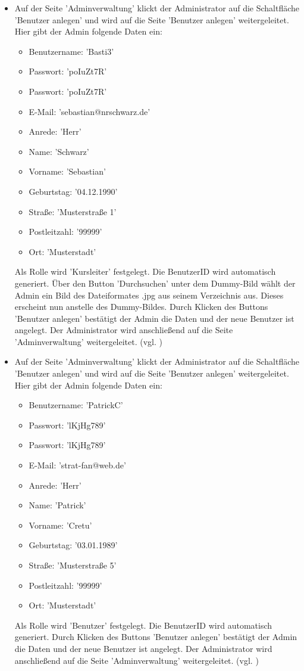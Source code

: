 \documentclass[a4paper]{scrreprt}
\begin{document}
\begin{itemize}
				\item {} 
				 Auf der Seite 'Adminverwaltung' klickt der Administrator auf die Schaltfläche 'Benutzer anlegen' und wird auf die Seite 'Benutzer anlegen' weitergeleitet. Hier gibt der Admin folgende Daten ein:
					\begin{itemize}
						\item Benutzername: 'Basti3' 
						\item Passwort: 'poIuZt7R'
						\item Passwort: 'poIuZt7R'
						\item E-Mail: 'sebastian@nrschwarz.de'
						\item Anrede: 'Herr'
						\item Name: 'Schwarz'
						\item Vorname: 'Sebastian'
						\item Geburtstag: '04.12.1990'
						\item Straße: 'Musterstraße 1'
						\item Postleitzahl: '99999'
						\item Ort: 'Musterstadt'
					\end{itemize}
				 Als Rolle wird 'Kursleiter' festgelegt. Die BenutzerID wird automatisch generiert. Über den Button 'Durchsuchen' unter dem Dummy-Bild wählt der Admin ein Bild des Dateiformates .jpg aus seinem Verzeichnis aus. Dieses erscheint nun anstelle des Dummy-Bildes. Durch Klicken des Buttons 'Benutzer anlegen' bestätigt der Admin die Daten und der neue Benutzer ist angelegt. Der Administrator wird anschließend auf die Seite 'Adminverwaltung' weitergeleitet. (vgl. )
				
				\item {} 
				Auf der Seite 'Adminverwaltung' klickt der Administrator auf die Schaltfläche 'Benutzer anlegen' und wird auf die Seite 'Benutzer anlegen' weitergeleitet. Hier gibt der Admin folgende Daten ein:
				\begin{itemize}
					\item Benutzername: 'PatrickC' 
					\item Passwort: 'lKjHg789'
					\item Passwort: 'lKjHg789'
					\item E-Mail: 'strat-fan@web.de'
					\item Anrede: 'Herr'
					\item Name: 'Patrick'
					\item Vorname: 'Cretu'
					\item Geburtstag: '03.01.1989'
					\item Straße: 'Musterstraße 5'
					\item Postleitzahl: '99999'
					\item Ort: 'Musterstadt'
				\end{itemize}
				Als Rolle wird 'Benutzer' festgelegt. Die BenutzerID wird automatisch generiert. Durch Klicken des Buttons 'Benutzer anlegen' bestätigt der Admin die Daten und der neue Benutzer ist angelegt. Der Administrator wird anschließend auf die Seite 'Adminverwaltung' weitergeleitet. (vgl. )
				

\end{itemize}
\end{document}
